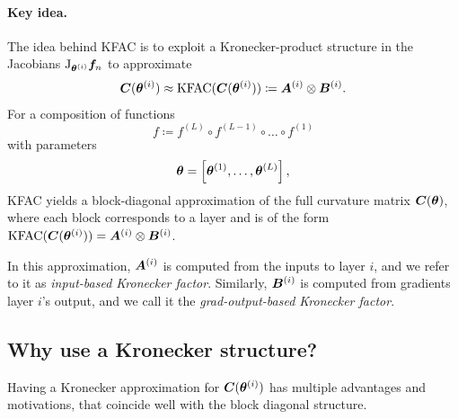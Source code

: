 \paragraph{Key idea.} The idea behind KFAC is to exploit a Kronecker-product structure in the Jacobians $\mathrm{J}_{{\bm{\theta}}^{(i)}}{\bm{f}}_n$ to approximate
\begin{align*}
  {\bm{C}}({\bm{\theta}}^{(i)})
  \approx
  \mathrm{KFAC}({\bm{C}}({\bm{\theta}}^{(i)}))
  \coloneqq {\bm{A}}^{(i)} \otimes {\bm{B}}^{(i)}.
\end{align*}
For a composition of functions $$f \coloneqq f^{(L)} \circ f^{(L-1)} \circ \dots \circ f^{(1)}$$ with parameters $${\bm{\theta}} = \left[ {\bm{\theta}}^{(1)}, \dots, {\bm{\theta}}^{(L)} \right],$$ KFAC yields a block-diagonal approximation of the full curvature matrix ${\bm{C}}({\bm{\theta}})$, where each block corresponds to a layer and is of the form $\mathrm{KFAC}({\bm{C}}({\bm{\theta}}^{(i)})) = {\bm{A}}^{{(i)}} \otimes {\bm{B}}^{(i)}$.

In this approximation, ${\bm{A}}^{(i)}$ is computed from the inputs to layer $i$, and we refer to it as \emph{input-based Kronecker factor}.
Similarly, ${\bm{B}}^{(i)}$ is computed from gradients \wrt layer $i$'s output, and we call it the \emph{grad-output-based Kronecker factor}.

\subsection{Why use a Kronecker structure?}
Having a Kronecker approximation for ${\bm{C}}({\bm{\theta}}^{(i)})$ has multiple advantages and motivations, that coincide well with the block diagonal structure.

